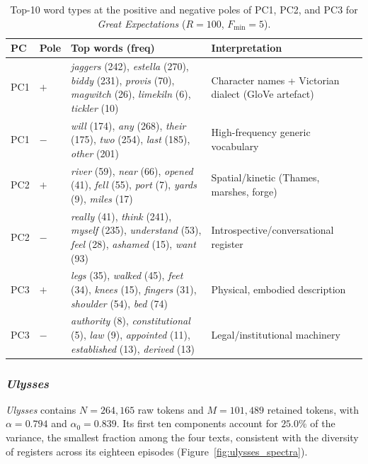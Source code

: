 \documentclass[12pt,a4paper]{article}
\begin{document}
\begin{table}[htbp]
\centering
\caption{Top-10 word types at the positive and negative poles
of PC1, PC2, and PC3 for \emph{Great Expectations}
($R=100$, $F_{\min}=5$).}
\label{tab:greatexp_pc}
\small
\setlength{\tabcolsep}{4pt}
\begin{tabular}{ll p{6cm} p{5.5cm}}
\toprule
PC & Pole & Top words (freq) & Interpretation \\
\midrule
PC1 & $+$ &
  \emph{jaggers} (242), \emph{estella} (270), \emph{biddy} (231),
  \emph{provis} (70), \emph{magwitch} (26),
  \emph{limekiln} (6), \emph{tickler} (10)
  & Character names + Victorian dialect (GloVe artefact) \\
PC1 & $-$ &
  \emph{will} (174), \emph{any} (268), \emph{their} (175),
  \emph{two} (254), \emph{last} (185), \emph{other} (201)
  & High-frequency generic vocabulary \\
\midrule
PC2 & $+$ &
  \emph{river} (59), \emph{near} (66), \emph{opened} (41),
  \emph{fell} (55), \emph{port} (7), \emph{yards} (9),
  \emph{miles} (17)
  & Spatial/kinetic (Thames, marshes, forge) \\
PC2 & $-$ &
  \emph{really} (41), \emph{think} (241), \emph{myself} (235),
  \emph{understand} (53), \emph{feel} (28),
  \emph{ashamed} (15), \emph{want} (93)
  & Introspective/conversational register \\
\midrule
PC3 & $+$ &
  \emph{legs} (35), \emph{walked} (45), \emph{feet} (34),
  \emph{knees} (15), \emph{fingers} (31),
  \emph{shoulder} (54), \emph{bed} (74)
  & Physical, embodied description \\
PC3 & $-$ &
  \emph{authority} (8), \emph{constitutional} (5),
  \emph{law} (9), \emph{appointed} (11),
  \emph{established} (13), \emph{derived} (13)
  & Legal/institutional machinery \\
\bottomrule
\end{tabular}
\end{table}

\subsubsection{\emph{Ulysses}}
\label{sec:ulysses}

\emph{Ulysses} contains $N=264{,}165$ raw tokens and $M=101{,}489$
retained tokens, with $\alpha=0.794$ and $\alpha_0=0.839$. Its first
ten components account for $25.0\%$ of the variance, the smallest
fraction among the four texts, consistent with the diversity of
registers across its eighteen episodes
(Figure~\ref{fig:ulysses_spectra}).
\end{document}
